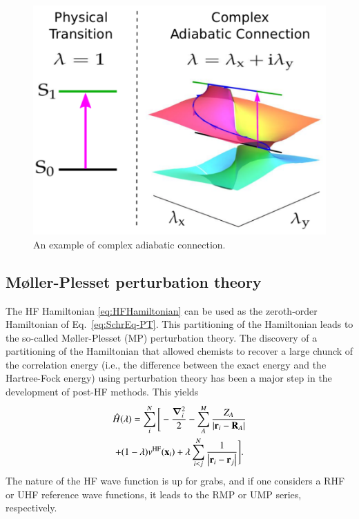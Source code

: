 \documentclass[aps,prb,reprint,noshowkeys,superscriptaddress]{revtex4-1}
\newcommand{\latin}[1]{#1}
\newcommand{\ie}{\latin{i.e.}}
\newcommand{\hH}{\Hat{H}}
\begin{document}
\begin{figure}
	\includegraphics[width=\linewidth]{iAC}
	\caption{
	\label{fig:iAC}
	An example of complex adiabatic connection. \cite{Burton_2019}}
\end{figure}

\subsection{M{\o}ller-Plesset perturbation theory}

The HF Hamiltonian \eqref{eq:HFHamiltonian} can be used as the zeroth-order Hamiltonian of Eq.~\eqref{eq:SchrEq-PT}. This partitioning of the Hamiltonian leads to the so-called M{\o}ller-Plesset (MP) perturbation theory. \cite{Moller_1934} 
The discovery of a partitioning of the Hamiltonian that allowed chemists to recover a large chunck of the correlation energy (\ie, the difference between the exact energy and the Hartree-Fock energy) using perturbation theory has been a major step in the development of post-HF methods. 
This yields
\begin{multline}\label{eq:MPHamiltonian}
    \hH(\lambda) = 
    \sum_{i}^{N} \Bigg[ 
    -\frac{\grad_i^2}{2} 
    - \sum_{A}^{M} \frac{Z_A}{\abs{\vb{r}_i-\vb{R}_A}} 
    \\
    + (1-\lambda) v^{\text{HF}}(\vb{x}_i) 
    + \lambda\sum_{i<j}^{N}\frac{1}{\abs{\vb{r}_i-\vb{r}_j}} 
    \Bigg].
\end{multline}
The nature of the HF wave function is up for grabs, and if one considers a RHF or UHF reference wave functions, it leads to the RMP or UMP series, respectively.
\end{document}
